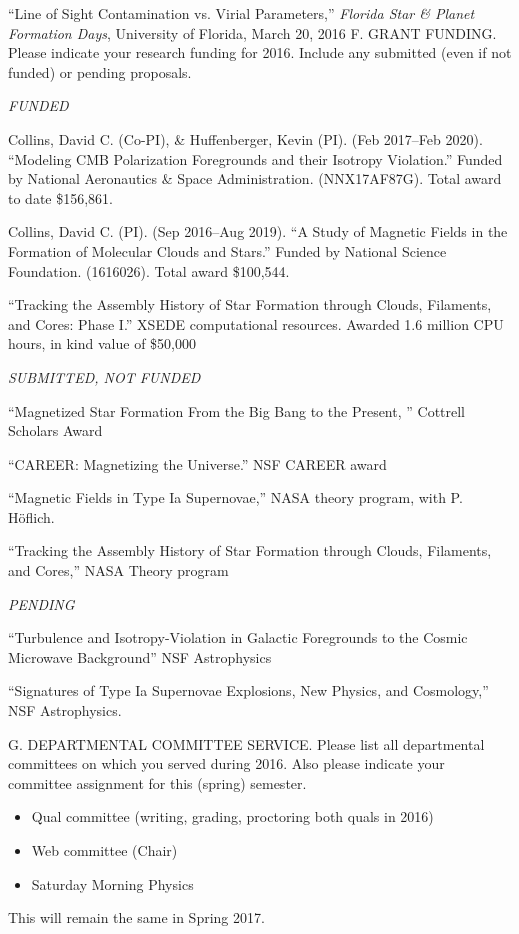 ``Line of Sight Contamination vs.  Virial Parameters,'' 
{\it Florida Star \& Planet Formation Days}, University of Florida, March 20,
2016
\bigskip
\noindent F. GRANT FUNDING. Please indicate your research funding
for 2016. Include any submitted  (even if not funded) or pending
proposals.
\bigskip
%

\emph{FUNDED}
\medskip

Collins, David C. (Co-PI), \& Huffenberger, Kevin (PI). (Feb 2017–Feb 2020).
``Modeling CMB Polarization Foregrounds and their Isotropy Violation.'' Funded
by National Aeronautics \& Space Administration. (NNX17AF87G). Total award to
date \$156,861. 

Collins, David C. (PI). (Sep 2016–Aug 2019). ``A Study of Magnetic Fields
in the Formation of Molecular Clouds and Stars.'' Funded by National
Science Foundation. (1616026). Total award \$100,544. 

``Tracking the Assembly History of Star Formation through Clouds, Filaments, and
Cores: Phase I.'' XSEDE computational resources.  Awarded 1.6 million CPU hours,
in kind value of \$50,000

\medskip
\emph{SUBMITTED, NOT FUNDED}
\medskip

``Magnetized Star Formation From the Big Bang to the Present, '' Cottrell
Scholars Award

``CAREER: Magnetizing the Universe.'' NSF CAREER award

``Magnetic Fields in Type Ia Supernovae,'' NASA theory program, with P.
H\"oflich.


``Tracking the Assembly History of Star Formation through Clouds, Filaments, and
Cores,'' NASA Theory program

\medskip
\emph{PENDING} 
\medskip

``Turbulence and Isotropy-Violation in Galactic Foregrounds to the
Cosmic Microwave Background'' NSF Astrophysics

``Signatures of Type Ia Supernovae Explosions,
New Physics, and Cosmology,'' NSF Astrophysics. 

\medskip
\noindent G. DEPARTMENTAL COMMITTEE SERVICE. Please list all
departmental committees on which you served during 2016.  Also
please indicate your committee assignment for this (spring)
semester.
\bigskip
\begin{itemize}
\item Qual committee (writing, grading, proctoring both quals in 2016)
\item Web committee (Chair)
\item Saturday Morning Physics
\end{itemize}
This will remain the same in Spring 2017.



